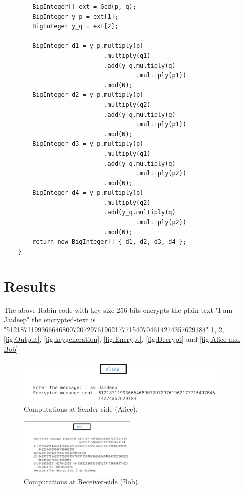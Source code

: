 \documentclass[12pt,a4paper]{article}
\begin{document}
\begin{verbatim}
        BigInteger[] ext = Gcd(p, q); 
        BigInteger y_p = ext[1]; 
        BigInteger y_q = ext[2]; 
  
        BigInteger d1 = y_p.multiply(p) 
                            .multiply(q1) 
                            .add(y_q.multiply(q) 
                                     .multiply(p1)) 
                            .mod(N); 
        BigInteger d2 = y_p.multiply(p) 
                            .multiply(q2) 
                            .add(y_q.multiply(q) 
                                     .multiply(p1)) 
                            .mod(N); 
        BigInteger d3 = y_p.multiply(p) 
                            .multiply(q1) 
                            .add(y_q.multiply(q) 
                                     .multiply(p2)) 
                            .mod(N); 
        BigInteger d4 = y_p.multiply(p) 
                            .multiply(q2) 
                            .add(y_q.multiply(q) 
                                     .multiply(p2)) 
                            .mod(N); 
        return new BigInteger[] { d1, d2, d3, d4 }; 
    } 
\end{verbatim}

\section{Results}
The above Rabin-code with key-size 256 bits encrypts the plain-text "I
am Jaideep" the encrypted-text is
"512187119936664680072072976196217771540704614274357629184"
\ref{fig:Alice}, \ref{fig:Bob}, \ref{fig:Output}, \ref{fig:keygeneration}, \ref{fig:Encrypt}, \ref{fig:Decrypt} and \ref{fig:Alice and Bob}
\begin{figure}[htbp]
  \centering
  \includegraphics[width=4in]{Alice.jpg}
  \caption{Computations at Sender-side (Alice).}
  \label{fig:Alice}
\end{figure}

\begin{figure}[htbp]
  \centering
  \includegraphics[width=0.5\textwidth]{Bob.jpg}
  \caption{Computations at Receiver-side (Bob).}
  \label{fig:Bob}
\end{figure}
\end{document}
